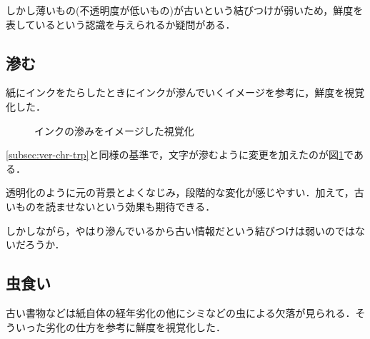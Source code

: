 しかし薄いもの(不透明度が低いもの)が古いという結びつけが弱いため，鮮度を表しているという認識を与えられるか疑問がある．

\subsection{滲む}
\label{subsec:ver-chr-bld}

紙にインクをたらしたときにインクが滲んでいくイメージを参考に，鮮度を視覚化した．

\begin{figure}[htbp]
  \begin{center}
  \end{center}
  \caption{インクの滲みをイメージした視覚化}
  \label{fig:ver-bleeding}
\end{figure}

\ref{subsec:ver-chr-trp}と同様の基準で，文字が滲むように変更を加えたのが図\ref{fig:ver-bleeding}である．

透明化のように元の背景とよくなじみ，段階的な変化が感じやすい．加えて，古いものを読ませないという効果も期待できる．

しかしながら，やはり滲んでいるから古い情報だという結びつけは弱いのではないだろうか．

\subsection{虫食い}
\label{subsec:ver-chr-wh}

古い書物などは紙自体の経年劣化の他にシミなどの虫による欠落が見られる．そういった劣化の仕方を参考に鮮度を視覚化した．

